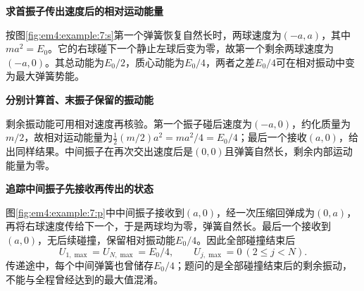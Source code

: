 \begin{solution}\textbf{求首振子传出速度后的相对运动能量}\par\nobreak
按图\ref{fig:em4:example:7:s}第一个弹簧恢复自然长时，两球速度为$(-a,a)$，其中$ma^2=E_0$。它的右球碰下一个静止左球后变为零，故第一个剩余两球速度为$(-a,0)$。其总动能为$E_0/2$，质心动能为$E_0/4$，两者之差$E_0/4$可在相对振动中变为最大弹簧势能。



\par\medskip{}\noindent\textbf{分别计算首、末振子保留的振动能}\par\nobreak
剩余振动能可用相对速度再核验。第一个振子碰后速度为$(-a,0)$，约化质量为$m/2$，故相对运动能量为$\tfrac12(m/2)a^2=ma^2/4=E_0/4$；最后一个接收$(a,0)$，给出同样结果。中间振子在再次交出速度后是$(0,0)$且弹簧自然长，剩余内部运动能量为零。



\par\medskip{}\noindent\textbf{追踪中间振子先接收再传出的状态}\par\nobreak
图\ref{fig:em4:example:7:p}中中间振子接收到$(a,0)$，经一次压缩回弹成为$(0,a)$，再将右球速度传给下一个，于是两球均为零，弹簧自然长。最后一个接收到$(a,0)$，无后续碰撞，保留相对振动能$E_0/4$。因此全部碰撞结束后
\[\boxed{U_{1,\max}=U_{N,\max}=E_0/4,\qquad U_{j,\max}=0\ (2\le j<N)}.\]
传递途中，每个中间弹簧也曾储存$E_0/4$；题问的是全部碰撞结束后的剩余振动，不能与全程曾经达到的最大值混淆。\end{solution}
